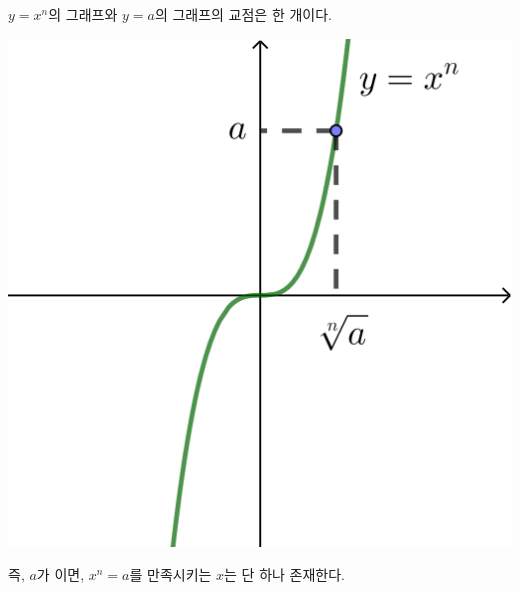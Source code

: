 \documentclass{oblivoir}
\begin{document}
\begin{enumerate}
\begin{minipage}{0.6\textwidth}
\(y=x^n\)의 그래프와 \(y=a\)의 그래프의 교점은 한 개이다.
\end{minipage}
\begin{minipage}{.3\textwidth}
\begin{center}
\includegraphics[height=0.2\textheight]{nthroot-odd}
\end{center}
\end{minipage}
\par
즉, \(a\)가 이면, \(x^n=a\)를 만족시키는   \(x\)는 단 하나 존재한다.
\end{enumerate}

%
\end{document}
